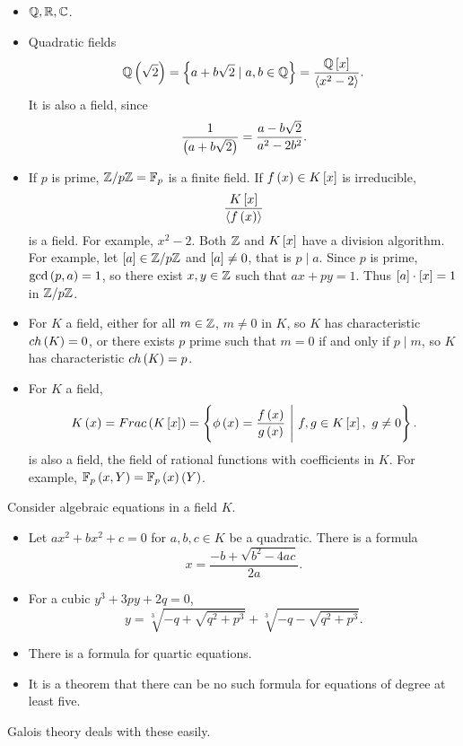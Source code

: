 \begin{example}
\hfill
\begin{itemize}
\item $ \Q, \R, \C $.
\item Quadratic fields
$$ \Q\rb{\sqrt{2}} = \cb{a + b\sqrt{2} \mid a, b \in \Q} = \dfrac{\Q\sb{x}}{\ab{x^2 - 2}}. $$
It is also a field, since
$$ \dfrac{1}{\rb{a + b\sqrt{2}}} = \dfrac{a - b\sqrt{2}}{a^2 - 2b^2}. $$
\item If $ p $ is prime, $ \Z / p\Z = \F_p $ is a finite field. If $ f\rb{x} \in K\sb{x} $ is irreducible,
$$ \dfrac{K\sb{x}}{\ab{f\rb{x}}} $$
is a field. For example, $ x^2 - 2 $. Both $ \Z $ and $ K\sb{x} $ have a division algorithm. For example, let $ \sb{a} \in \Z / p\Z $ and $ \sb{a} \ne 0 $, that is $ p \mid a $. Since $ p $ is prime, $ \gcd\rb{p, a} = 1 $, so there exist $ x, y \in \Z $ such that $ ax + py = 1 $. Thus $ \sb{a} \cdot \sb{x} = 1 $ in $ \Z / p\Z $.
\item For $ K $ a field, either for all $ m \in \Z $, $ m \ne 0 $ in $ K $, so $ K $ has characteristic $ ch\rb{K} = 0 $, or there exists $ p $ prime such that $ m = 0 $ if and only if $ p \mid m $, so $ K $ has characteristic $ ch\rb{K} = p $.
\item For $ K $ a field,
$$ K\rb{x} = Frac\rb{K\sb{x}} = \cb{\phi\rb{x} = \dfrac{f\rb{x}}{g\rb{x}} \ \Bigg| \ f, g \in K\sb{x}, \ g \ne 0}. $$
is also a field, the field of rational functions with coefficients in $ K $. For example, $ \F_p\rb{x, Y} = \F_p\rb{x}\rb{Y} $.
\end{itemize}
\end{example}

\begin{example}
Consider algebraic equations in a field $ K $.
\begin{itemize}
\item Let $ ax^2 + bx^2 + c = 0 $ for $ a, b, c \in K $ be a quadratic. There is a formula
$$ x = \dfrac{-b + \sqrt{b^2 - 4ac}}{2a}. $$
\item For a cubic $ y^3 + 3py + 2q = 0 $,
$$ y = \sqrt[3]{-q + \sqrt{q^2 + p^3}} + \sqrt[3]{-q - \sqrt{q^2 + p^3}}. $$
\item There is a formula for quartic equations.
\item It is a theorem that there can be no such formula for equations of degree at least five.
\end{itemize}
Galois theory deals with these easily.
\end{example}

